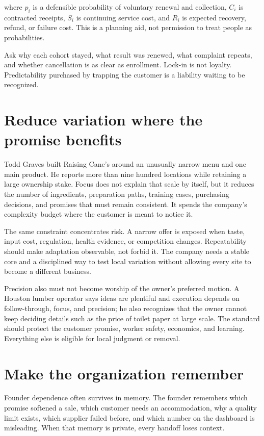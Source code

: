 where \(p_i\) is a defensible probability of voluntary renewal and collection,
\(C_i\) is contracted receipts, \(S_i\) is continuing service cost, and
\(R_i\) is expected recovery, refund, or failure cost. This is a planning aid,
not permission to treat people as probabilities.

Ask why each cohort stayed, what result was renewed, what complaint repeats,
and whether cancellation is as clear as enrollment. Lock-in is not loyalty.
Predictability purchased by trapping the customer is a liability waiting to
be recognized.

\section{Reduce variation where the promise benefits}

Todd Graves built Raising Cane's around an unusually narrow menu and one main
product. He reports more than nine hundred locations while retaining a large
ownership stake. Focus does not explain that scale by itself, but it reduces
the number of ingredients, preparation paths, training cases, purchasing
decisions, and promises that must remain consistent. It spends the company's
complexity budget where the customer is meant to notice it.

The same constraint concentrates risk. A narrow offer is exposed when taste,
input cost, regulation, health evidence, or competition changes. Repeatability
should make adaptation observable, not forbid it. The company needs a stable
core and a disciplined way to test local variation without allowing every site
to become a different business.

Precision also must not become worship of the owner's preferred motion. A
Houston lumber operator says ideas are plentiful and execution depends on
follow-through, focus, and precision; he also recognizes that the owner cannot
keep deciding details such as the price of toilet paper at large scale. The
standard should protect the customer promise, worker safety, economics, and
learning. Everything else is eligible for local judgment or removal.

\section{Make the organization remember}

Founder dependence often survives in memory. The founder remembers which
promise softened a sale, which customer needs an accommodation, why a quality
limit exists, which supplier failed before, and which number on the dashboard
is misleading. When that memory is private, every handoff loses context.


